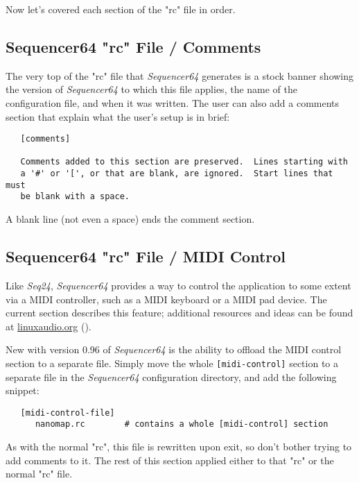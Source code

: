    Now let's covered each section of the "rc" file in order.

\subsection{Sequencer64 "rc" File / Comments}
\label{subsec:seq64_rc_file_midi_comments}

   The very top of the "rc" file that \textsl{Sequencer64} generates is a stock
   banner showing the version of \textsl{Sequencer64} to which this file
   applies, the name of the configuration file, and when it was written.  The
   user can also add a comments section that explain what the user's setup is
   in brief:

   \begin{verbatim}
   [comments]

   Comments added to this section are preserved.  Lines starting with
   a '#' or '[', or that are blank, are ignored.  Start lines that must
   be blank with a space.
   \end{verbatim}

   A blank line (not even a space) ends the comment section.

\subsection{Sequencer64 "rc" File / MIDI Control}
\label{subsec:seq64_rc_file_midi_control}

   Like \textsl{Seq24}, \textsl{Sequencer64} provides a way to control the
   application to some extent via a MIDI controller, such as a MIDI keyboard or
   a MIDI pad device.  The current section describes this feature;
   additional resources and ideas can be found at \url{linuxaudio.org}
   (\cite{midicontrol}).

   New with version 0.96 of \textsl{Sequencer64} is the ability
   to offload the MIDI control section to a separate file.  Simply move
   the whole \texttt{[midi-control]} section to a separate file in
   the \textsl{Sequencer64} configuration directory, and add the following
   snippet:

   \begin{verbatim}
   [midi-control-file]
      nanomap.rc        # contains a whole [midi-control] section
   \end{verbatim}

   As with the normal "rc", this file is rewritten upon exit, so
   don't bother trying to add comments to it.  The rest of this section
   applied either to that "rc" or the normal "rc" file.

